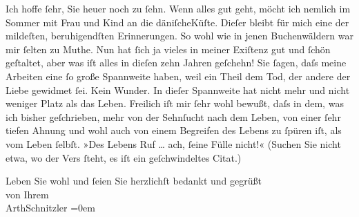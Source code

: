 \pstart
           Ich hoffe{ }ſehr, Sie heuer noch zu{ }ſehn. Wenn alles gut geht, möcht ich nemlich im
               Sommer mit Frau und Kind an die däniſcheKüſte. Dieſer \label{K_L01590-2v}\label{K_L01590-2} bleibt für mich eine der mildeſten, beruhigendſten Erinnerungen. So wohl wie
               in jenen Buchenwäldern war mir{ }ſelten zu Muthe. Nun hat{ }ſich ja vieles in meiner
               Exiſtenz gut und{ }ſchön geſtaltet, aber was iſt alles in dieſen zehn Jahren geſchehn!
               Sie{ }ſagen, daſs meine Arbeiten eine{ }ſo große Spannweite haben, weil ein Theil dem
               Tod, der andere der Liebe gewidmet {\pb}ſei. Kein
               Wunder. In dieſer Spannweite hat nicht mehr und nicht weniger Platz als das Leben.
               Freilich iſt mir{ }ſehr wohl bewußt, daſs in dem, was ich bisher geſchrieben, mehr von
               der Sehnſucht nach dem Leben, von einer{ }ſehr tiefen Ahnung und wohl auch von einem
               Begreifen des Lebens zu{ }ſpüren iſt, als vom Leben{ }ſelbſt. »Des Lebens Ruf {\dots} ach,{ }ſeine Fülle nicht!« (Suchen Sie nicht etwa, wo der
               Vers {\pb}ſteht, es iſt ein geſchwindeltes Citat.)\pend
           
\pstart
           Leben Sie wohl und{ }ſeien Sie herzlichſt bedankt und gegrüßt{\\[\baselineskip]}von Ihrem{\\[\baselineskip]}\spacefill\mbox{ArthSchnitzler}\pend
           \leftskip=0em{}\endnumbering{}  \newcommand{\dateiname}{L01590}\newcommand{\titel}{Arthur Schnitzler an Georg Brandes, 13. 3. 1906}\newcommand{\editorInnen}{Martin Anton Müller und Gerd-Hermann Susen}
